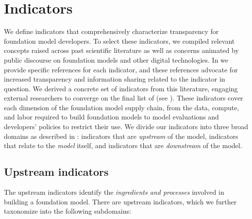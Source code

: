 \hypertarget{indicators}{\section{Indicators}}
\label{sec:indicators}
We define \numindicators indicators that comprehensively characterize transparency for foundation model developers.  
To select these indicators, we compiled relevant concepts raised across past scientific literature as well as concerns animated by public discourse on foundation models and other digital technologies. In  we provide specific references for each indicator, and these references advocate for increased transparency and information sharing related to the indicator in question.
We derived a concrete set of indicators from this literature, engaging external researchers to converge on the final list of \numindicators (see ).
These indicators cover each dimension of the foundation model supply chain, from the data, compute, and labor required to build foundation models to model evaluations and developers' policies to restrict their use. 
We divide our indicators into three broad domains as described in : indicators that are \textit{upstream} of the model, indicators that relate to the \textit{model} itself, and indicators that are \textit{downstream} of the model.

\hypertarget{upstream-indicators}{\subsection{Upstream indicators}}
\label{sec:upstream-indicators}
The upstream indicators identify the \emph{ingredients and processes} involved in building a foundation model. 
There are \numupstreamindicators upstream indicators, which we further taxonomize into the following \numupstreamsubdomains subdomains:

